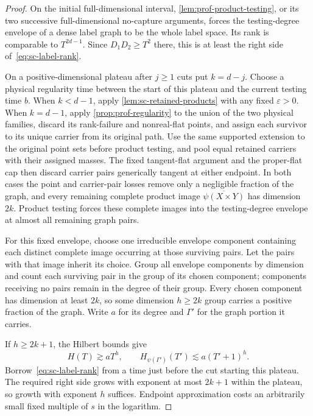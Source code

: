 \begin{proof}
On the initial full-dimensional interval, \cref{lem:prof-product-testing}, or its two successive full-dimensional no-capture arguments, forces the testing-degree envelope of a dense label graph to be the whole label space. Its rank is comparable to $T^{2d-1}$.  Since $D_1D_2\ge T^2$ there, this is at least the right side of~\eqref{eq:sc-label-rank}.

On a positive-dimensional plateau after $j\ge1$ cuts put $k=d-j$.  Choose a physical regularity time between the start of this plateau and the current testing time $b$. When $k<d-1$, apply \cref{lem:sc-retained-products} with any fixed $\varepsilon>0$.  When $k=d-1$, apply \cref{prop:prof-regularity} to the union of the two physical families, discard its rank-failure and nonreal-flat points, and assign each survivor to its unique carrier from its original path.  Use the same supported extension to the original point sets before product testing, and pool equal retained carriers with their assigned masses.  The fixed tangent-flat argument and the proper-flat cap then discard carrier pairs generically tangent at either endpoint. In both cases the point and carrier-pair losses remove only a negligible fraction of the graph, and every remaining complete product image $\overline{\psi(X\times Y)}$ has dimension $2k$. Product testing forces these complete images into the testing-degree envelope at almost all remaining graph pairs.

For this fixed envelope, choose one irreducible envelope component containing each distinct complete image occurring at those surviving pairs.  Let the pairs with that image inherit its choice.  Group all envelope components by dimension and count each surviving pair in the group of its chosen component; components receiving no pairs remain in the degree of their group.  Every chosen component has dimension at least $2k$, so some dimension $h\ge2k$ group carries a positive fraction of the graph.  Write $a$ for its degree and $\Gamma'$ for the graph portion it carries.

If $h\ge2k+1$, the Hilbert bounds give
\[
 H(T)\gtrsim aT^h,\qquad
 H_{\psi(\Gamma')}(T')\lesssim a(T'+1)^h.
\]
Borrow~\eqref{eq:sc-label-rank} from a time just before the cut starting this plateau.  The required right side grows with exponent at most $2k+1$ within the plateau, so growth with exponent $h$ suffices.  Endpoint approximation costs an arbitrarily small fixed multiple of $s$ in the logarithm.


\end{proof}
